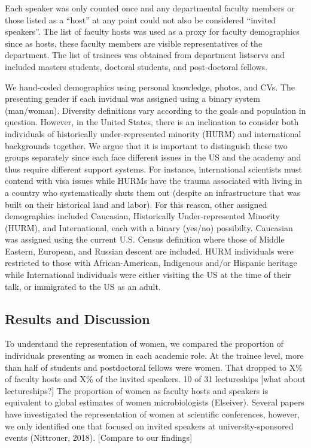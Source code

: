 \documentclass[10pt,]{article}
\begin{document}
Each speaker was only counted once and any departmental faculty members
or those listed as a ``host'' at any point could not also be considered
``invited speakers''. The list of faculty hosts was used as a proxy for
faculty demographics since as hosts, these faculty members are visible
representatives of the department. The list of trainees was obtained
from department listservs and included masters students, doctoral
students, and post-doctoral fellows.

We hand-coded demographics using personal knowledge, photos, and CVs.
The presenting gender if each invidual was assigned using a binary
system (man/woman). Diversity definitions vary according to the goals
and population in question. However, in the United States, there is an
inclination to consider both individuals of historically
under-represented minority (HURM) and international backgrounds
together. We argue that it is important to distinguish these two groups
separately since each face different issues in the US and the academy
and thus require different support systems. For instance, international
scientists must contend with visa issues while HURMs have the trauma
associated with living in a country who systematically shuts them out
(despite an infrastructure that was built on their historical land and
labor). For this reason, other assigned demographics included Caucasian,
Historically Under-represented Minority (HURM), and International, each
with a binary (yes/no) possibilty. Caucasian was assigned using the
current U.S. Census definition where those of Middle Eastern, European,
and Russian descent are included. HURM individuals were restricted to
those with African-American, Indigenous and/or Hispanic heritage while
International individuals were either visiting the US at the time of
their talk, or immigrated to the US as an adult.

\subsection{Results and Discussion}\label{results-and-discussion}

To understand the representation of women, we compared the proportion of
individuals presenting as women in each academic role. At the trainee
level, more than half of students and postdoctoral fellows were women.
That dropped to X\% of faculty hosts and X\% of the invited speakers. 10
of 31 lectureships {[}what about lectureships?{]} The proportion of
women as faculty hosts and speakers is equivalent to global estimates of
women microbiologists (Elseiver). Several papers have investigated the
representation of women at scientific conferences, however, we only
identified one that focused on invited speakers at university-sponsored
events (Nittrouer, 2018). {[}Compare to our findings{]}
\end{document}
